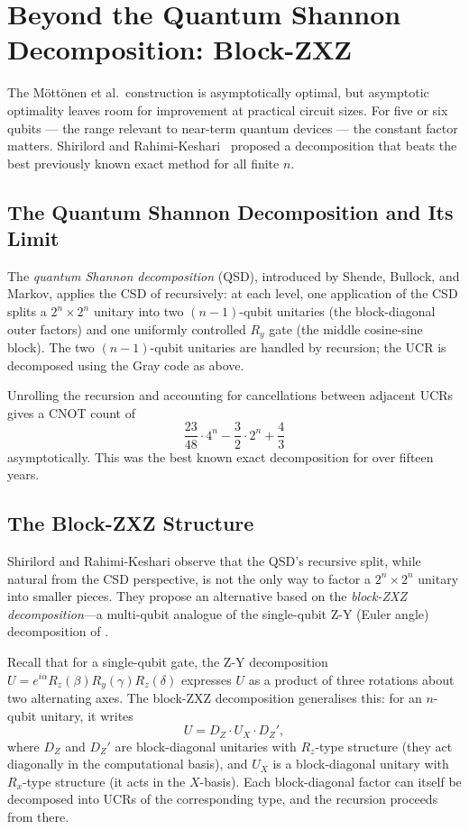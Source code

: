 \documentclass[12pt, a4paper, oneside]{report}
\theoremstyle{plain}
\theoremstyle{definition}
\theoremstyle{remark}
\newcommand{\Rx}{R_x}
\newcommand{\Ry}{R_y}
\newcommand{\Rz}{R_z}
\begin{document}

\section{Beyond the Quantum Shannon Decomposition: Block-ZXZ}
\label{sec:block-zxz}

The Möttönen et al.\ construction is asymptotically optimal, but asymptotic optimality
leaves room for improvement at practical circuit sizes. For five or six qubits --- the range
relevant to near-term quantum devices --- the constant factor matters. Shirilord and
Rahimi-Keshari~\cite{shirilord2024} proposed a decomposition that beats the best previously
known exact method for all finite $n$.

\subsection{The Quantum Shannon Decomposition and Its Limit}

The \emph{quantum Shannon decomposition} (QSD), introduced by Shende, Bullock, and Markov,
applies the CSD of  recursively: at each level, one application of the CSD
splits a $2^n \times 2^n$ unitary into two $(n-1)$-qubit unitaries (the block-diagonal
outer factors) and one uniformly controlled $\Ry$ gate (the middle cosine-sine block). The
two $(n-1)$-qubit unitaries are handled by recursion; the UCR is decomposed using the Gray
code as above.

Unrolling the recursion and accounting for cancellations between adjacent UCRs gives a
CNOT count of
\[
  \frac{23}{48} \cdot 4^n - \frac{3}{2} \cdot 2^n + \frac{4}{3}
\]
asymptotically. This was the best known exact decomposition for over fifteen years.

\subsection{The Block-ZXZ Structure}

Shirilord and Rahimi-Keshari observe that the QSD's recursive split, while natural from the
CSD perspective, is not the only way to factor a $2^n \times 2^n$ unitary into smaller
pieces. They propose an alternative based on the \emph{block-ZXZ decomposition}---a
multi-qubit analogue of the single-qubit Z-Y (Euler angle) decomposition of .

Recall that for a single-qubit gate, the Z-Y decomposition $U = e^{i\alpha}\Rz(\beta)\Ry(\gamma)\Rz(\delta)$
expresses $U$ as a product of three rotations about two alternating axes. The block-ZXZ
decomposition generalises this: for an $n$-qubit unitary, it writes
\[
  U = D_Z \cdot U_X \cdot D_Z',
\]
where $D_Z$ and $D_Z'$ are block-diagonal unitaries with $\Rz$-type structure (they act
diagonally in the computational basis), and $U_X$ is a block-diagonal unitary with $\Rx$-type
structure (it acts in the $X$-basis). Each block-diagonal factor can itself be decomposed
into UCRs of the corresponding type, and the recursion proceeds from there.
\end{document}
